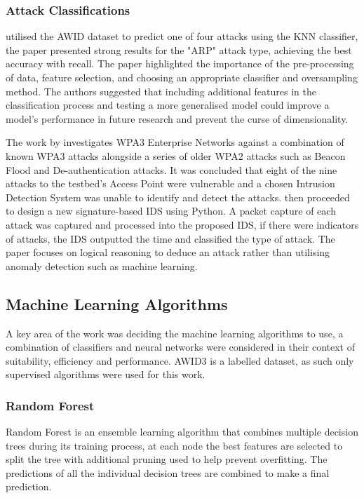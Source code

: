 \subsubsection*{Attack Classifications}

\textcite{10.1007/978-3-030-98457-1_1} utilised the AWID dataset to predict one of four attacks using the KNN classifier, the paper presented strong results for the "ARP" attack type, achieving the best accuracy with recall. The paper highlighted the importance of the pre-processing of data, feature selection, and choosing an appropriate classifier and oversampling method. The authors suggested that including additional features in the classification process and testing a more generalised model could improve a model's performance in future research and prevent the curse of dimensionality.

\medskip
The work by \textcite{DBLP:journals/corr/abs-2110-04259} investigates WPA3 Enterprise Networks against a combination of known WPA3 attacks alongside a series of older WPA2 attacks such as Beacon Flood and De-authentication attacks. It was concluded that eight of the nine attacks to the testbed's Access Point were vulnerable and a chosen Intrusion Detection System was unable to identify and detect the attacks. \textcite{DBLP:journals/corr/abs-2110-04259} then proceeded to design a new signature-based IDS using Python. A packet capture of each attack was captured and processed into the proposed IDS, if there were indicators of attacks, the IDS outputted the time and classified the type of attack. The paper focuses on logical reasoning to deduce an attack rather than utilising anomaly detection such as machine learning.
 
\subsection{Machine Learning Algorithms}

A key area of the work was deciding the machine learning algorithms to use, a combination of classifiers and neural networks were considered in their context of suitability, efficiency and performance. AWID3 is a labelled dataset, as such only supervised algorithms were used for this work.

\subsubsection{Random Forest}

Random Forest is an ensemble learning algorithm that combines multiple decision trees during its training process, at each node the best features are selected to split the tree with additional pruning used to help prevent overfitting. The predictions of all the individual decision trees are combined to make a final prediction.

